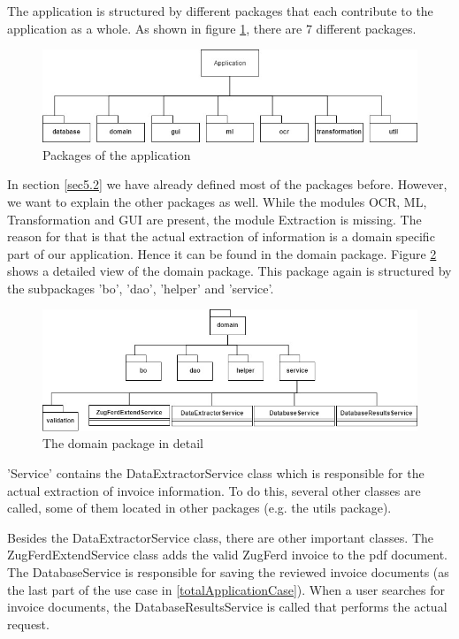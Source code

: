 The application is structured by different packages that each contribute to the application as a whole.
As shown in figure \ref{applicationUML}, there are 7 different packages. 

\begin{figure}[ht!]
\centering
\includegraphics[width=\textwidth]{Images/UML/ApplicationUML.jpg}
\caption{Packages of the application \label{applicationUML}}
\end{figure}

In section \ref{sec5.2} we have already defined most of the packages before. However, we want to explain the other packages as well. While the modules OCR, ML, Transformation and GUI are present, the module Extraction is missing. The reason for that is that the actual extraction of information is a domain specific part of our application. Hence it can be found in the domain package. Figure \ref{domainUML} shows a detailed view of the domain package. This package again is structured by the subpackages 'bo', 'dao', 'helper' and 'service'.

\begin{figure}[ht!]
\centering
\includegraphics[width=\textwidth]{Images/UML/DomainUML.jpg}
\caption{The domain package in detail \label{domainUML}}
\end{figure}

'Service' contains the DataExtractorService class which is responsible for the actual extraction of invoice information. To do this, several other classes are called, some of them located in other packages (e.g. the utils package).

Besides the DataExtractorService class, there are other important classes. The ZugFerdExtendService class adds the valid ZugFerd invoice to the pdf document. The DatabaseService is responsible for saving the reviewed invoice documents (as the last part of the use case in \ref{totalApplicationCase}). When a user searches for invoice documents, the DatabaseResultsService is called that performs the actual request.

